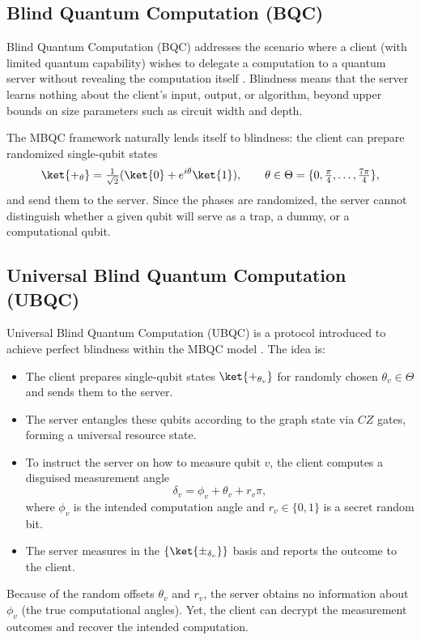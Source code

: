 \subsection{Blind Quantum Computation (BQC)}

Blind Quantum Computation (BQC) addresses the scenario where a client (with limited quantum capability) wishes to delegate a computation to a quantum server without revealing the computation itself \cite{}. Blindness means that the server learns nothing about the client’s input, output, or algorithm, beyond upper bounds on size parameters such as circuit width and depth.

The MBQC framework naturally lends itself to blindness: the client can prepare
randomized single-qubit states
\[
\ket{+_{\theta}} = \tfrac{1}{\sqrt{2}}(\ket{0} + e^{i\theta}\ket{1}),
\qquad \theta \in \Theta = \{0,\tfrac{\pi}{4},\dots, \tfrac{7\pi}{4}\},
\]
and send them to the server. Since the phases are randomized, the server cannot
distinguish whether a given qubit will serve as a trap, a dummy, or a
computational qubit.

\subsection{Universal Blind Quantum Computation (UBQC)}

Universal Blind Quantum Computation (UBQC) is a protocol introduced to achieve
perfect blindness within the MBQC model \cite{}. The idea is:

\begin{itemize}
  \item The client prepares single-qubit states $\ket{+_{\theta_v}}$ for
        randomly chosen $\theta_v \in \Theta$ and sends them to the server.
  \item The server entangles these qubits according to the graph state via
        $CZ$ gates, forming a universal resource state.
  \item To instruct the server on how to measure qubit $v$, the client computes
        a disguised measurement angle
        \[
        \delta_v = \phi_v + \theta_v + r_v \pi,
        \]
        where $\phi_v$ is the intended computation angle and $r_v \in \{0,1\}$
        is a secret random bit.
  \item The server measures in the $\{ \ket{\pm_{\delta_v}} \}$ basis and
        reports the outcome to the client.
\end{itemize}

Because of the random offsets $\theta_v$ and $r_v$, the server obtains no
information about $\phi_v$ (the true computational angles). Yet, the client can
decrypt the measurement outcomes and recover the intended computation.

